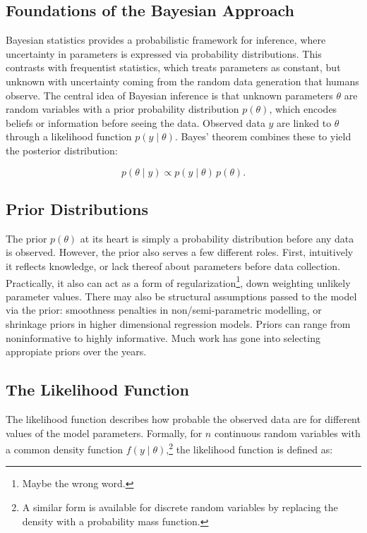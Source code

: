 \subsection{Foundations of the Bayesian Approach}
Bayesian statistics provides a probabilistic framework for inference, where uncertainty in parameters is expressed via probability distributions. 
This contrasts with frequentist statistics, which treats parameters as constant, but unknown with uncertainty coming from the random data generation that humans observe.  
The central idea of Bayesian inference is that unknown parameters $\theta$ are random variables with a prior probability distribution $p(\theta)$, which encodes beliefs or information before seeing the data. Observed data $y$ are linked to $\theta$ through a likelihood function $p(y \mid \theta)$. 
Bayes' theorem combines these to yield the posterior distribution:

\[
    p(\theta \mid y) \propto p(y \mid \theta)\, p(\theta).
\]

\subsection{Prior Distributions}
The prior $p(\theta)$ at its heart is simply a probability distribution before any data is observed.  
However, the prior also serves a few different roles.  
First, intuitively it reflects knowledge, or lack thereof about parameters before data collection.  
Practically, it also can act as a form of regularization\footnote{Maybe the wrong word.}, down weighting unlikely parameter values.  
There may also be structural assumptions passed to the model via the prior: smoothness penalties in non/semi-parametric modelling, or shrinkage priors in higher dimensional regression models.  
Priors can range from noninformative to highly informative.  
Much work has gone into selecting appropiate priors over the years\cite{jaynes_prior_1968}\cite{van_erp_shrinkage_2019}\cite{kass_selection_1996}.

\subsection{The Likelihood Function}
The likelihood function describes how probable the observed data are for different values of the model parameters. 
Formally, for \(n\) continuous random variables with a common density function \(f(y \mid \theta)\),\footnote{A similar form is available for discrete random variables by replacing the density with a probability mass function.} the likelihood function is defined as:

